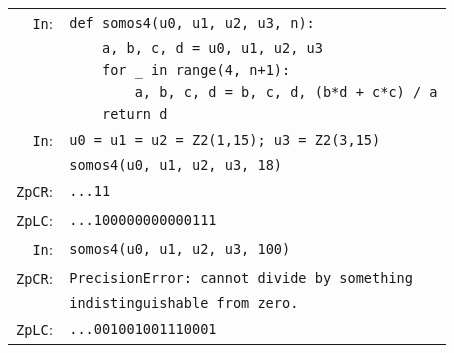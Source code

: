 \documentclass[sigconf]{acmart}
\newcommand{\cIn}{{\color{input} \tt \phantom{Zp}In}:}
\newcommand{\cZpCR}{{\color{output} \tt ZpCR}:}
\newcommand{\cZpFP}{{\color{output} \tt ZpFP}:}
\newcommand{\cZpLC}{{\color{output} \tt ZpLC}:}
\theoremstyle{definition}
\begin{document}
{\noindent \small
\begin{tabular}{rl}
\cIn
 & {\color{keyword}\verb?def?}\verb? ?{\color{function}\verb?somos4?}\verb?(u0, u1, u2, u3, n):? \\
 & \verb?    a, b, c, d = u0, u1, u2, u3? \\
 & \verb?    ?{\color{keyword}\verb?for?}\verb? _ in ?{\color{keyword}\verb?range?}\verb?(4, n+1):? \\
 & \verb?        a, b, c, d = b, c, d, (b*d + c*c) / a? \\
 & \verb?    ?{\color{keyword}\verb?return?}\verb? d? \\
\cIn
 & \verb?u0 = u1 = u2 = ?{\color{ring}\verb?Z2?}\verb?(1,15); u3 = ?{\color{ring}\verb?Z2?}\verb?(3,15)? \\
 & {\color{function}\verb?somos4?}\verb?(u0, u1, u2, u3, 18)? \\
\cZpCR
 & \verb?...11? \\
\cZpLC
 & \verb?...100000000000111? \\
\cIn
 & {\color{function}\verb?somos4?}\verb?(u0, u1, u2, u3, 100)? \\
\cZpCR
 & {\color{error}\verb?PrecisionError?}\verb?: cannot divide by something?\\
 &\verb?indistinguishable from zero.? \\
\cZpLC
 & \verb?...001001001110001? \\
\end{tabular}}
\end{document}
